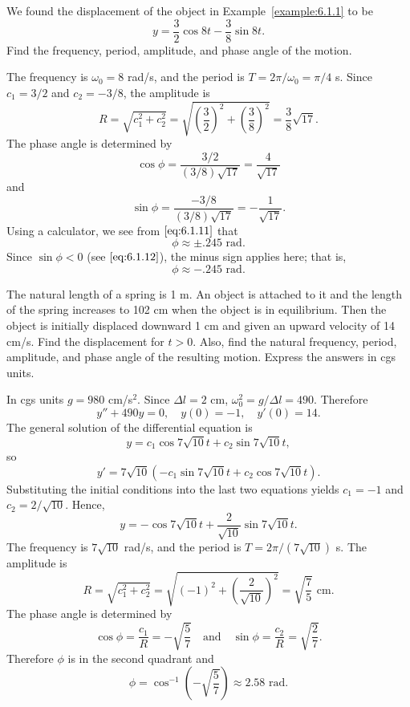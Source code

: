 \documentclass{ximera}
\begin{document}
\begin{example}\label{example:6.1.2}
We found the displacement of the object
 in Example~\ref{example:6.1.1} to be
$$
y=\frac{3}{2}\cos8t-\frac{3}{8}\sin8t.
$$
Find the frequency, period, amplitude, and phase angle of the motion.
 
\begin{explanation}
The frequency is $\omega_0=8$ rad/s, and the period is
$T=2\pi/\omega_0=\pi/4$ s. Since $c_1=3/2$ and $c_2=-3/8$,
the amplitude is
$$
R=\sqrt{c^2_1+c^2_2}=\sqrt{\left(\frac{3}{2}\right)^2+\left(\frac{3}{8}\right)^2}
=\frac{3}{8}\sqrt{17}.
$$
The phase angle is determined by
\begin{equation}\label{eq:6.1.11}
\cos\phi=\frac{3/2}{(3/8)\sqrt{17}}=\frac{4}{\sqrt{17}}
\end{equation}
and
\begin{equation}\label{eq:6.1.12}
\sin\phi=\frac{-3/8}{(3/8)\sqrt{17}}=-\frac{1}{\sqrt{17}}.
\end{equation}
Using a calculator, we see from $\eqref{eq:6.1.11}$ that
$$
\phi\approx\pm.245\mbox{ rad}.
$$
Since $\sin\phi<0$ (see $\eqref{eq:6.1.12}$), the minus sign applies here;
that is,
$$
\phi\approx-.245\mbox{ rad}.
$$
\end{explanation}
\end{example}
 
 
\begin{example}\label{example:6.1.3}
The natural length of a spring is 1 m. An object is attached to it and
the length of the spring increases to 102 cm when the object is in
equilibrium. Then the object is initially displaced downward 1 cm and
given an upward velocity of 14 cm/s. Find the displacement for
$t>0$. Also, find the natural frequency, period, amplitude, and phase
angle of the resulting motion. Express the answers in cgs units.
 
\begin{explanation}
In cgs units $g=980$ cm/s$^2$. Since $\Delta l=2$ cm,
$\omega_0^2=g/\Delta l=490$.
Therefore
$$
y''+490y=0, \quad  y(0)=-1,\quad y'(0)=14.
$$
 The general solution of the differential equation is
$$
y=c_1\cos7\sqrt{10}t+c_2\sin7\sqrt{10}t,
$$
so
$$
y'=7\sqrt{10}\left(-c_1\sin7\sqrt{10}t+c_2\cos7\sqrt{10}t\right).
$$
Substituting the initial conditions into the last two equations yields
$c_1=-1$ and $c_2=2/\sqrt{10}$. Hence,
$$
y=-\cos7\sqrt{10}t+\frac{2}{\sqrt{10}}\sin7\sqrt{10}t.
$$
The frequency is $7\sqrt{10}$ rad/s, and  the period
is $T=2\pi/(7\sqrt{10})$  s.
The amplitude  is
$$
R=\sqrt{c_1^2+c_2^2}=\sqrt{(-1)^2+\left(\frac{2}{\sqrt{10}}\right)^2}=
\sqrt{\frac{7}{5}}\mbox{ cm}.
$$
The  phase angle  is determined by
$$
\cos\phi=\frac{c_1}{R}=-\sqrt{\frac{5}{7}}\quad\mbox{and}\quad\sin\phi=
\frac{c_2}{R}=\sqrt{\frac{2}{7}}.
$$
Therefore $\phi$ is in the second quadrant and
$$
\phi=\cos^{-1}\left(-\sqrt{\frac{5}{7}}\right)\approx2.58\mbox{ rad}.
$$
\end{explanation}
\end{example}
 
\end{document}
